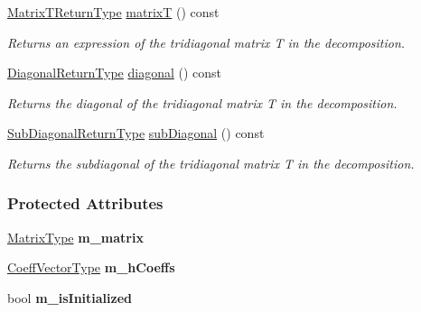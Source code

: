 \begin{DoxyCompactItemize}
\hyperlink{struct_eigen_1_1internal_1_1_tridiagonalization_matrix_t_return_type}{Matrix\+T\+Return\+Type} \hyperlink{group___eigenvalues___module_a6eb5ef94b8b9bb013c0e69b6df56d0df}{matrixT} () const
\begin{DoxyCompactList}\small\item\em Returns an expression of the tridiagonal matrix T in the decomposition. \end{DoxyCompactList}\item 
\hyperlink{class_eigen_1_1internal_1_1_tensor_lazy_evaluator_writable}{Diagonal\+Return\+Type} \hyperlink{group___eigenvalues___module_a73e246e30a97206ce0c717db98b06c41}{diagonal} () const
\begin{DoxyCompactList}\small\item\em Returns the diagonal of the tridiagonal matrix T in the decomposition. \end{DoxyCompactList}\item 
\hyperlink{class_eigen_1_1internal_1_1_tensor_lazy_evaluator_writable}{Sub\+Diagonal\+Return\+Type} \hyperlink{group___eigenvalues___module_a5b2b4e8e38575564f7e8c89d2105fcc5}{sub\+Diagonal} () const
\begin{DoxyCompactList}\small\item\em Returns the subdiagonal of the tridiagonal matrix T in the decomposition. \end{DoxyCompactList}\end{DoxyCompactItemize}
\subsubsection*{Protected Attributes}
\begin{DoxyCompactItemize}
\item 
\mbox{\label{group___eigenvalues___module_ad42459daade3a276a0bb2846e18fabf6}} 
\hyperlink{group___eigenvalues___module_add0f4b2216d0ea8ee0f7d8525deaf0a9}{Matrix\+Type} {\bfseries m\+\_\+matrix}
\item 
\mbox{\label{group___eigenvalues___module_a78512d647c0ab9ee6271f7afa5d25140}} 
\hyperlink{group___core___module}{Coeff\+Vector\+Type} {\bfseries m\+\_\+h\+Coeffs}
\item 
\mbox{\label{group___eigenvalues___module_acc6410d0df0ef3deba95d9cdfcd7fd65}} 
bool {\bfseries m\+\_\+is\+Initialized}
\end{DoxyCompactItemize}


